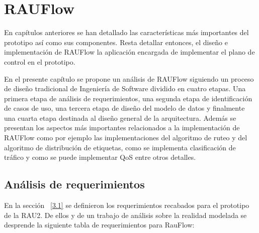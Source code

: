 \chapter{RAUFlow}
\label{Capítulo 5}

\ifpdf
    \graphicspath{{Chapter5/Figs/Raster/}{Chapter5/Figs/PDF/}{Chapter5/Figs/}}
\else
    \graphicspath{{Chapter5/Figs/Vector/}{Chapter5/Figs/}}
\fi

En cap\'itulos anteriores se han detallado las caracter\'isticas m\'as importantes del prototipo así como sus componentes. Resta detallar entonces, el dise\~no e implementaci\'on de RAUFlow la aplicaci\'on encargada de implementar el plano de control en el prototipo. 

En el presente cap\'itulo se propone un an\'alisis de RAUFlow siguiendo un proceso de dise\~no tradicional de Ingenier\'ia de Software dividido en cuatro etapas. Una primera etapa de an\'alisis de requerimientos, una segunda etapa de identificaci\'on de casos de uso, una tercera etapa de dise\~no del modelo de datos y finalmente una cuarta etapa destinada al dise\~no general de la arquitectura. Adem\'as se presentan los aspectos m\'as importantes relacionados a la implementaci\'on de RAUFlow como por ejemplo las implementaciones del algoritmo de ruteo y del algoritmo de distribución de etiquetas, como se implementa clasificaci\'on de tr\'afico y como se puede implementar QoS entre otros detalles. 

\section[An\'alisis de requerimientos]{An\'alisis de requerimientos}
\label{section5.1}

En la sección ~\ref{3.1} se definieron los requerimientos recabados para el prototipo de la RAU2. De ellos y de un trabajo de an\'alisis sobre la realidad modelada se desprende la siguiente tabla de requerimientos para RauFlow:

